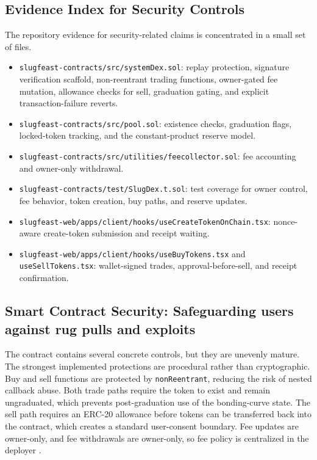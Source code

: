 \documentclass[10pt,letterpaper]{article}
\begin{document}
\subsection*{Evidence Index for Security Controls}
The repository evidence for security-related claims is concentrated in a small set of files.
\begin{itemize}[leftmargin=1.25em]
  \item \texttt{slugfeast-contracts/src/systemDex.sol}: replay protection, signature verification scaffold, non-reentrant trading functions, owner-gated fee mutation, allowance checks for sell, graduation gating, and explicit transaction-failure reverts.
  \item \texttt{slugfeast-contracts/src/pool.sol}: existence checks, graduation flags, locked-token tracking, and the constant-product reserve model.
  \item \texttt{slugfeast-contracts/src/utilities/feecollector.sol}: fee accounting and owner-only withdrawal.
  \item \texttt{slugfeast-contracts/test/SlugDex.t.sol}: test coverage for owner control, fee behavior, token creation, buy paths, and reserve updates.
  \item \texttt{slugfeast-web/apps/client/hooks/useCreateTokenOnChain.tsx}: nonce-aware create-token submission and receipt waiting.
  \item \texttt{slugfeast-web/apps/client/hooks/useBuyTokens.tsx} and \texttt{useSellTokens.tsx}: wallet-signed trades, approval-before-sell, and receipt confirmation.
\end{itemize}

\subsection{Smart Contract Security: Safeguarding users against rug pulls and exploits}
The contract contains several concrete controls, but they are unevenly mature. The strongest implemented protections are procedural rather than cryptographic. Buy and sell functions are protected by \texttt{nonReentrant}, reducing the risk of nested callback abuse. Both trade paths require the token to exist and remain ungraduated, which prevents post-graduation use of the bonding-curve state. The sell path requires an ERC-20 allowance before tokens can be transferred back into the contract, which creates a standard user-consent boundary. Fee updates are owner-only, and fee withdrawals are owner-only, so fee policy is centralized in the deployer \citep{OpenZeppelinContracts}.
\end{document}
